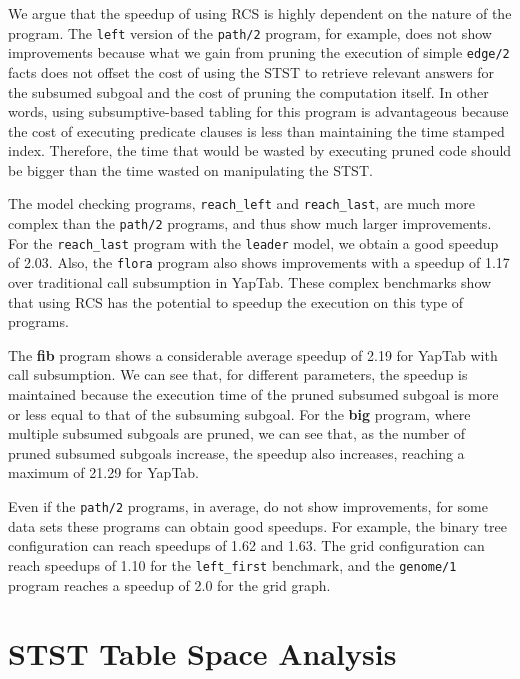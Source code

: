 We argue that the speedup of using RCS is highly dependent on the nature of the program.
The \texttt{left} version
of the \texttt{path/2} program, for example, does not show improvements because what we gain from pruning the
execution of simple \texttt{edge/2} facts does not offset the cost of using the STST to retrieve relevant answers
for the subsumed subgoal and
the cost of pruning the computation itself. In other words, using subsumptive-based tabling for this program is
advantageous because the cost of executing predicate clauses is less than maintaining the time stamped index.
Therefore, the time that would be wasted by executing pruned code should be bigger than the time wasted
on manipulating the STST.

The model checking programs, \texttt{reach\_left} and \texttt{reach\_last}, are much more complex than the \texttt{path/2}
programs, and thus show much larger improvements. For the \texttt{reach\_last} program with the \texttt{leader} model,
we obtain a good speedup of 2.03. Also, the \texttt{flora} program also shows improvements with a speedup of 1.17 over
traditional call subsumption in YapTab. These complex benchmarks show that using RCS has the potential to speedup the
execution on this type of programs.

The \textbf{fib} program shows a considerable average speedup of 2.19 for YapTab with call subsumption.
We can see that, for different parameters, the speedup is maintained because the execution time of the pruned subsumed
subgoal is more or less equal to that of the subsuming subgoal. For the \textbf{big} program, where multiple
subsumed subgoals are pruned, we can see that, as the number of pruned subsumed subgoals increase, the speedup
also increases, reaching a maximum of 21.29 for YapTab.

Even if the \texttt{path/2} programs, in average, do not show improvements, for some data sets
these programs can obtain good speedups. For example, the binary tree configuration can reach speedups of 1.62 and 1.63. The grid configuration can reach speedups of 1.10 for the \texttt{left\_first} benchmark, and the \texttt{genome/1}
program reaches a speedup of 2.0 for the grid graph.





\section{STST Table Space Analysis}

